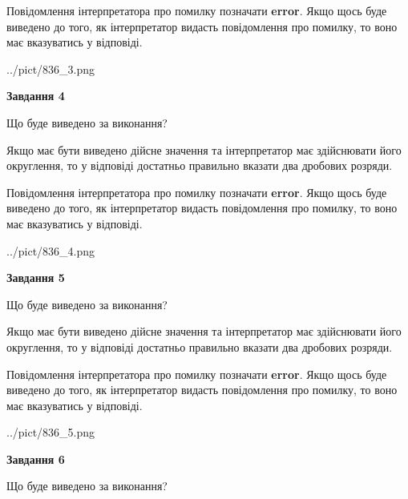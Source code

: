 \documentclass[12pt, ukrainian]{article}
\begin{document}
{\begin {Large}
Повідомлення інтерпретатора про помилку позначати \textbf{error}.
Якщо щось буде виведено до того, як інтерпретатор видасть повідомлення про помилку, 
то воно має вказуватись у відповіді. \par

\begin{center}
	{../pict/836_3.png}
\end{center}
\newpage

{\begin {center}\textbf{Завдання 4}\end {center}}\par
Що буде виведено за виконання? \par

Якщо має бути виведено дійсне значення та інтерпретатор має здійснювати його округлення, 
то у відповіді достатньо правильно вказати два дробових розряди.

Повідомлення інтерпретатора про помилку позначати \textbf{error}.
Якщо щось буде виведено до того, як інтерпретатор видасть повідомлення про помилку, 
то воно має вказуватись у відповіді. \par

\begin{center}
	{../pict/836_4.png}
\end{center}
\newpage

{\begin {center}\textbf{Завдання 5}\end {center}}\par
Що буде виведено за виконання? \par

Якщо має бути виведено дійсне значення та інтерпретатор має здійснювати його округлення, 
то у відповіді достатньо правильно вказати два дробових розряди.

Повідомлення інтерпретатора про помилку позначати \textbf{error}.
Якщо щось буде виведено до того, як інтерпретатор видасть повідомлення про помилку, 
то воно має вказуватись у відповіді. \par

\begin{center}
	{../pict/836_5.png}
\end{center}
\newpage

{\begin {center}\textbf{Завдання 6}\end {center}}\par
Що буде виведено за виконання? \par


\end{Large}}
\end{document}
